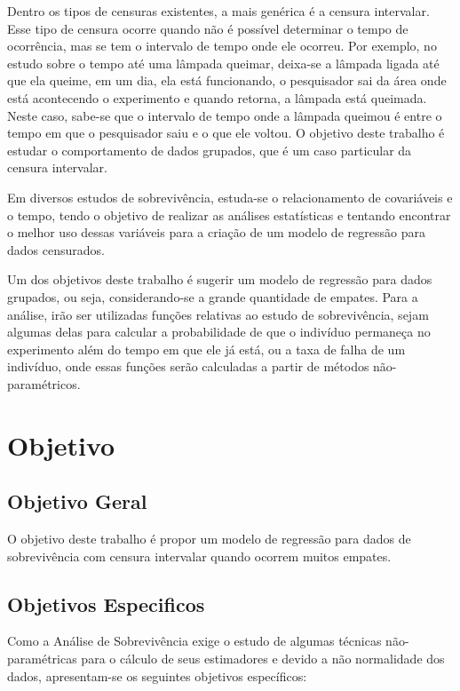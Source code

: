 \documentclass[a4paper,12pt]{article}
\begin{document}
Dentro os tipos de censuras existentes, a mais genérica é a censura intervalar. Esse tipo de censura ocorre quando não é possível determinar o tempo de ocorrência, mas se tem o intervalo de tempo onde ele ocorreu. Por exemplo, no estudo sobre o tempo até uma lâmpada queimar, deixa-se a lâmpada ligada até que ela queime, em um dia, ela está funcionando, o pesquisador sai da área onde está acontecendo o experimento e quando retorna, a lâmpada está queimada. Neste caso, sabe-se que o intervalo de tempo onde a lâmpada queimou é entre o tempo em que o pesquisador saiu e o que ele voltou. O objetivo deste trabalho é estudar o comportamento de dados grupados, que é um caso particular da censura intervalar.

Em diversos estudos de sobrevivência, estuda-se o relacionamento de covariáveis e o tempo, tendo o objetivo de realizar as análises estatísticas e tentando encontrar o melhor uso dessas variáveis para a criação de um modelo de regressão para dados censurados.

Um dos objetivos deste trabalho é sugerir um modelo de regressão para dados grupados, ou seja, considerando-se a grande quantidade de empates. Para a análise, irão ser utilizadas funções relativas ao estudo de sobrevivência, sejam algumas delas para calcular a probabilidade de que o indivíduo permaneça no experimento além do tempo em que ele já está, ou a taxa de falha de um indivíduo, onde essas funções serão calculadas a partir de métodos não-paramétricos.



\section{Objetivo}
\noindent

\subsection{Objetivo Geral}

O objetivo deste trabalho é propor um modelo de regressão para dados de sobrevivência com censura intervalar quando ocorrem muitos empates.

\subsection{Objetivos Especificos}

Como a Análise de Sobrevivência exige o estudo de algumas técnicas não-paramétricas para o cálculo de seus estimadores e devido a não normalidade dos dados, apresentam-se os seguintes objetivos específicos:
\end{document}
